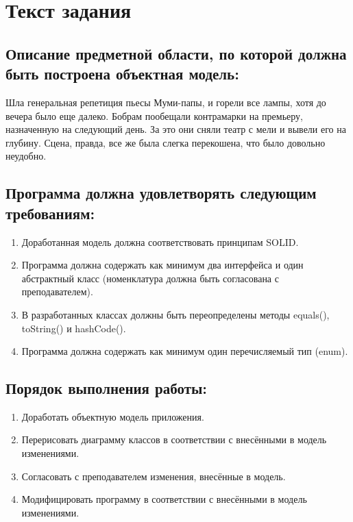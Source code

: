 \documentclass{article}
\begin{document}
\itmo[
  variant=15677557,
  labn=3,
  discipline=Программирование,
  group=P3115,
  student=Владимир Мацюк,
  teacher=Сорокин Роман Борисович
]

\section{Текст задания}
\subsection{Описание предметной области, по которой должна быть построена объектная модель:}

Шла генеральная репетиция пьесы Муми-папы, и горели все лампы, хотя до вечера было еще далеко. Бобрам пообещали контрамарки на премьеру, назначенную на следующий день. За это они сняли театр с мели и вывели его на глубину. Сцена, правда, все же была слегка перекошена, что было довольно неудобно.
\subsection{Программа должна удовлетворять следующим требованиям:}
\begin{enumerate}
  \item Доработанная модель должна соответствовать принципам SOLID.
  \item Программа должна содержать как минимум два интерфейса и один абстрактный класс (номенклатура должна быть согласована с преподавателем).
  \item В разработанных классах должны быть переопределены методы equals(), toString() и hashCode().
  \item Программа должна содержать как минимум один перечисляемый тип (enum).
\end{enumerate}
\subsection{Порядок выполнения работы:}
\begin{enumerate}
  \item Доработать объектную модель приложения.
  \item Перерисовать диаграмму классов в соответствии с внесёнными в модель изменениями.
  \item Согласовать с преподавателем изменения, внесённые в модель.
  \item Модифицировать программу в соответствии с внесёнными в модель изменениями.
\end{enumerate}
\end{document}
